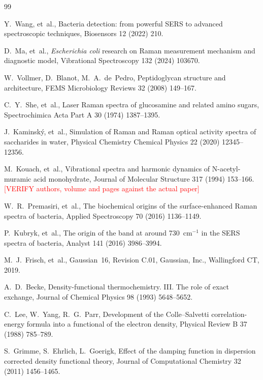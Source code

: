 \documentclass[preprint,12pt]{elsarticle}
\newcommand{\authorcheck}[1]{\textcolor{red}{[#1]}}
\begin{document}
\begin{thebibliography}{99}

Y.~Wang, et~al., Bacteria detection: from powerful SERS to advanced
spectroscopic techniques, Biosensors 12 (2022) 210.

D.~Ma, et~al., \emph{Escherichia coli} research on Raman measurement mechanism
and diagnostic model, Vibrational Spectroscopy 132 (2024) 103670.

W.~Vollmer, D.~Blanot, M.~A.~de~Pedro, Peptidoglycan structure and architecture,
FEMS Microbiology Reviews 32 (2008) 149--167.

C.~Y.~She, et~al., Laser Raman spectra of glucosamine and related amino sugars,
Spectrochimica Acta Part A 30 (1974) 1387--1395.

J.~Kaminsk\'y, et~al., Simulation of Raman and Raman optical activity spectra of
saccharides in water, Physical Chemistry Chemical Physics 22 (2020) 12345--12356.

M.~Kouach, et~al., Vibrational spectra and harmonic dynamics of
N-acetyl-muramic acid monohydrate, Journal of Molecular Structure 317 (1994)
153--166.
\authorcheck{VERIFY authors, volume and pages against the actual paper}

W.~R.~Premasiri, et~al., The biochemical origins of the surface-enhanced Raman
spectra of bacteria, Applied Spectroscopy 70 (2016) 1136--1149.

P.~Kubryk, et~al., The origin of the band at around 730~cm$^{-1}$ in the SERS
spectra of bacteria, Analyst 141 (2016) 3986--3994.

M.~J.~Frisch, et~al., Gaussian~16, Revision C.01, Gaussian, Inc.,
Wallingford CT, 2019.

A.~D.~Becke, Density-functional thermochemistry. III. The role of exact
exchange, Journal of Chemical Physics 98 (1993) 5648--5652.

C.~Lee, W.~Yang, R.~G.~Parr, Development of the Colle--Salvetti
correlation-energy formula into a functional of the electron density, Physical
Review B 37 (1988) 785--789.

S.~Grimme, S.~Ehrlich, L.~Goerigk, Effect of the damping function in dispersion
corrected density functional theory, Journal of Computational Chemistry 32
(2011) 1456--1465.


\end{thebibliography}
\end{document}
